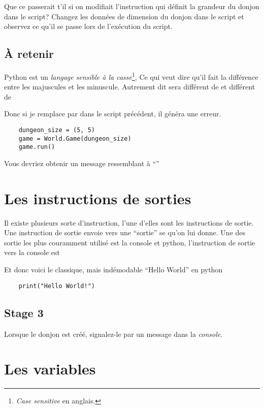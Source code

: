 Que ce passerait t’il si on modifiait l’instruction qui définit la grandeur du donjon dans le script?
Changez les données de dimension du donjon dans le script et observez ce qu'il se passe lors de l'exécution du script.

\subsection{\`{A} retenir}

Python est un \emph{langage sensible à la casse}\footnote{\textit{Case sensitive} en anglais.}, Ce qui veut dire qu'il fait la différence entre les majuscules et les minuscule. Autrement dit  sera différent de  et  différent de 

Donc si je remplace  par  dans le script précédent, il généra une erreur.

\begin{lstlisting}
    dungeon_size = (5, 5)
    game = World.Game(dungeon_size)
    game.run()
\end{lstlisting}

Vous devriez obtenir un message ressemblant à ``''

\section{Les instructions de sorties}

Il existe plusieurs sorte d’instruction, l’une d’elles sont les instructions de sortie.
Une instruction de sortie envoie vers une “sortie” se qu’on lui donne.
Une des sortie les plus couramment utilisé est la console et python, l’instruction de sortie vers la console est 

Et donc voici le classique, mais indémodable “Hello World” en python

\begin{lstlisting}
    print("Hello World!")
\end{lstlisting}


\subsection{Stage 3}
Lorsque le donjon est créé, signalez-le par un message dans la \emph{console}.

\section{Les variables}


